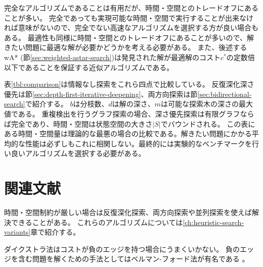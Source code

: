 完全なアルゴリズムであることは有用だが、時間・空間とのトレードオフにあることが多い。
完全であっても実現可能な時間・空間で実行することが出来なければ意味がないので、完全でない高速なアルゴリズムを選択する方が良い場合もある。
最適性も同様に時間・空間とのトレードオフにあることが多いので、解きたい問題に最適な解が必要かどうかを考える必要がある。
また、後述するwA* (節\ref{sec:weighted-astar-search})は発見された解が最適解のコスト$c^*$の定数倍以下であることを保証する近似アルゴリズムである。


表\ref{tbl:comparison}は情報なし探索をこれら四点で比較している。
反復深化深さ優先は節\ref{sec:depth-first-iterative-deepening}、両方向探索は節\ref{sec:bidirectional-search}で紹介する。
$b$は分枝数、$d$は解の深さ、$m$は可能な探索木の深さの最大値である。
重複検出を行うグラフ探索の場合、深さ優先探索は有限グラフならば完全であり、時間・空間は状態空間の大きさ$|S|$でバウンドされる。
この表にある時間・空間量は理論的な最悪の場合の比較である。解きたい問題にかかる平均的な性能は必ずしもこれに相関しない。最終的には実験的なベンチマークを行い良いアルゴリズムを選択する必要がある。

\begin{table}[tbh]
\centering
\caption{木探索アルゴリズムの比較 (\cite{russelln03}のFigure 3.21より)}
\label{tbl:comparison}
\end{table}


\section{関連文献}

時間・空間制約が厳しい場合は反復深化探索、両方向探索や並列探索を使えば解決できることがある。
これらのアルゴリズムについては\ref{ch:heuristic-search-variants}章で紹介する。

ダイクストラ法はコストが負のエッジを持つ場合にうまくいかない。
負のエッジを含む問題を解くための手法としてはベルマン-フォード法が有名である \cite{bellman1958routing,ford1956network}。

